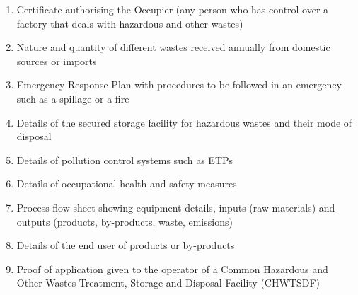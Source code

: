 \documentclass[a4paper, 12pt]{article}
\begin{document}
        \begin{enumerate}
        	\item Certificate authorising the Occupier (any person who has control over a factory that deals with hazardous and other wastes)
        	\item Nature and quantity of different wastes received annually from domestic sources or imports
        	\item Emergency Response Plan with procedures to be followed in an emergency such as a spillage or a fire
        	\item Details of the secured storage facility for hazardous wastes and their mode of disposal
        	\item Details of pollution control systems such as ETPs
        	\item Details of occupational health and safety measures
        	\item Process flow sheet showing equipment details, inputs (raw materials) and outputs (products, by-products, waste, emissions)
        	\item Details of the end user of products or by-products
        	\item Proof of application given to the operator of a Common Hazardous and Other Wastes Treatment, Storage and Disposal Facility (CHWTSDF)
        
        \end{enumerate}
        
      
         
         
             \newpage       
\end{document}
